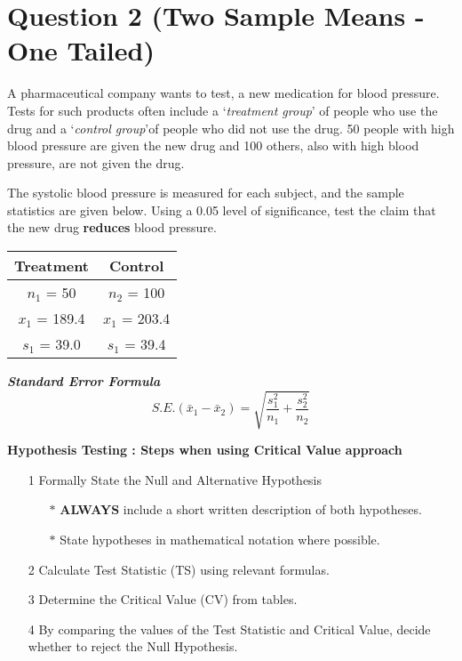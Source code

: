 \documentclass[a4paper,12pt]{article}
\begin{document}
	\section*{Question 2 (Two Sample Means - One Tailed)}
	A pharmaceutical company wants to test, a new medication for blood pressure. Tests
	for such products often include a `\textit{treatment group}' of people who use the drug and a `\textit{control group}'of people who did not use the drug. 50 people with high blood pressure are given the new drug and 100 others, also with high blood pressure, are not given the drug. 
	
	The systolic blood pressure is measured for each subject, and the sample statistics
	are given below. Using a 0.05 level of significance, test the claim that the new drug \textbf{reduces}
	blood pressure. 
	\begin{center}
		\begin{tabular}{|c||c|}
			\hline 
			Treatment & Control \\ \hline \hline
			$n_1$ = 50 & $n_2$ = 100 \\ \hline
			$x_1$ = 189.4  & $x_1$ = 203.4  \\ \hline
			$s_1$ = 39.0 & $s_1$ = 39.4 \\ \hline
		\end{tabular} 
	\end{center}
	\textbf{\textit{Standard Error Formula}}
	\[ S.E.(\bar{x}_1 - \bar{x}_2)  = \sqrt{\frac{s_1^2}{n_1} + \frac{s_2^2}{n_2}} \]
	

\begin{framed}
\noindent \textbf{Hypothesis Testing : Steps when using Critical Value approach}

\begin{itemize}
\item[1] Formally State the Null and Alternative Hypothesis \smallskip
{
\begin{itemize}
\item[$\ast$] \textbf{ALWAYS} include a short written description of both hypotheses.
\item[$\ast$] State hypotheses in mathematical notation where possible.

\end{itemize}
}
\item[2] Calculate Test Statistic (TS) using relevant formulas.\smallskip
\item[3] Determine the Critical Value (CV) from tables. \smallskip
\item[4] By comparing the values of the Test Statistic and Critical Value, decide whether to reject the Null Hypothesis.
\end{itemize}
\end{framed}
\end{document}
